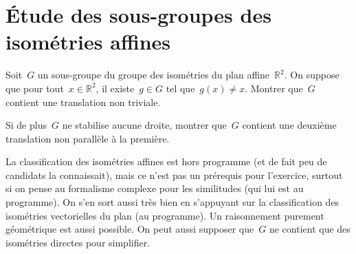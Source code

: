 \section{Étude des sous-groupes des isométries affines}

Soit~$G$ un sous-groupe du groupe des isométries du plan affine~$\mathbb{R}^2$.
On suppose que pour tout~$x\in \mathbb{R}^2$, il existe~$g\in G$ tel que~$g(x)\neq x$.
Montrer que~$G$ contient une translation non triviale.

Si de plus~$G$ ne stabilise aucune droite, montrer que~$G$ contient une deuxième translation non parallèle à la première.

\begin{em}
  La classification des isométries affines est hors programme (et de fait peu de
  candidats la connaissait), mais ce n'est pas un prérequis pour l'exercice,
  surtout si on pense au formalisme complexe pour les similitudes (qui lui est
  au programme).
  On s'en sort aussi très bien en s'appuyant sur la classification des isométries vectorielles du plan (au programme).
  Un raisonnement purement géométrique est aussi possible.
  On peut aussi supposer que~$G$ ne contient que des isométries directes pour simplifier.
\end{em}

